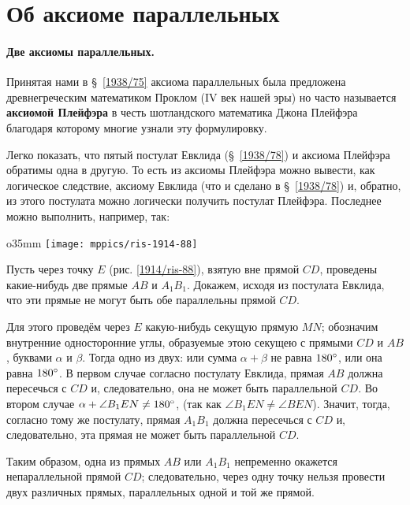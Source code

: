 \section{Об аксиоме параллельных}

\paragraph{Две аксиомы параллельных.}\label{1914/91} 
Принятая нами в §~\ref{1938/75} аксиома параллельных была предложена древнегреческим математиком Проклом (IV век нашей эры) но часто называется \textbf{аксиомой Плейфэра} в честь шотландского математика Джона Плейфэра благодаря которому многие узнали эту формулировку.  

Легко показать, что пятый постулат Евклида (§~\ref{1938/78}) и аксиома Плейфэра обратимы одна в другую. 
То есть из аксиомы Плейфэра можно вывести, как логическое следствие, аксиому Евклида (что и сделано в §~\ref{1938/78}) и, обратно, из этого постулата можно логически получить постулат Плейфэра.
Последнее можно выполнить, например, так:

\begin{wrapfigure}{o}{35mm}
\centering
\texttt{[image: mppics/ris-1914-88]}
\caption{}\label{1914/ris-88}
\end{wrapfigure}

Пусть через точку $E$ (рис. \ref{1914/ris-88}), взятую вне прямой $CD$, проведены какие-нибудь две прямые $AB$ и $A_1B_1$.
Докажем, исходя из постулата Евклида, что эти прямые не могут быть обе параллельны прямой $CD$.

Для этого проведём через $E$ какую-нибудь секущую прямую $MN$;
обозначим внутренние односторонние углы, образуемые этою секущею
с прямыми $CD$ и $AB$, буквами $\alpha$ и $\beta$.
Тогда одно из двух: или сумма $\alpha+\beta$ не равна $180\degree$,
или она равна $180\degree$.
В первом случае согласно постулату Евклида,
прямая $AB$ должна пересечься с $CD$ и, следовательно, она не может быть параллельной $CD$. 
Во втором случае $\alpha+\angle B_1EN\ne 180\degree$, (так как $\angle B_1EN\ne \angle BEN$).
Значит, тогда, согласно тому же постулату, прямая $A_1B_1$ должна пересечься
с $CD$ и, следовательно, эта прямая не может быть параллельной
$CD$.

Таким образом, одна из прямых $AB$ или $A_1B_1$ непременно окажется непараллельной прямой $CD$; следовательно, через одну точку нельзя провести двух различных прямых, параллельных одной и той же прямой.

